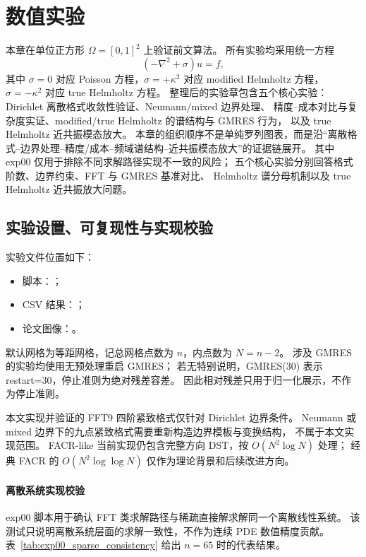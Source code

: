 \section{数值实验}
\label{sec:experiments}

本章在单位正方形 $\Omega=[0,1]^2$ 上验证前文算法。
所有实验均采用统一方程
\begin{equation}
  (-\nabla^2+\sigma)u=f,
\end{equation}
其中 $\sigma=0$ 对应 Poisson 方程，$\sigma=+\kappa^2$ 对应 modified Helmholtz 方程，
$\sigma=-\kappa^2$ 对应 true Helmholtz 方程。
整理后的实验章包含五个核心实验：
Dirichlet 离散格式收敛性验证、Neumann/mixed 边界处理、
精度--成本对比与复杂度实证、modified/true Helmholtz 的谱结构与 GMRES 行为，
以及 true Helmholtz 近共振模态放大。
本章的组织顺序不是单纯罗列图表，而是沿“离散格式--边界处理--精度/成本--频域谱结构--近共振模态放大”的证据链展开。
其中 exp00 仅用于排除不同求解路径实现不一致的风险；
五个核心实验分别回答格式阶数、边界约束、FFT 与 GMRES 基准对比、
Helmholtz 谱分母机制以及 true Helmholtz 近共振放大问题。

\subsection{实验设置、可复现性与实现校验}

实验文件位置如下：
\begin{itemize}[itemsep=1pt]
  \item 脚本：；
  \item CSV 结果：；
  \item 论文图像：。
\end{itemize}
默认网格为等距网格，记总网格点数为 $n$，内点数为 $N=n-2$。
涉及 GMRES 的实验均使用无预处理重启 GMRES；
若无特别说明，GMRES(30) 表示 restart=30，停止准则为绝对残差容差。
因此相对残差只用于归一化展示，不作为停止准则。

本文实现并验证的 FFT9 四阶紧致格式仅针对 Dirichlet 边界条件。
Neumann 或 mixed 边界下的九点紧致格式需要重新构造边界模板与变换结构，
不属于本文实现范围。
FACR-like 当前实现仍包含完整方向 DST，按 $O(N^2\log N)$ 处理；
经典 FACR 的 $O(N^2\log\log N)$ 仅作为理论背景和后续改进方向。

\paragraph{离散系统实现校验}
exp00 脚本用于确认 FFT 类求解路径与稀疏直接解求解同一个离散线性系统。
该测试只说明离散系统层面的求解一致性，不作为连续 PDE 数值精度贡献。
表~\ref{tab:exp00_sparse_consistency} 给出 $n=65$ 时的代表结果。

